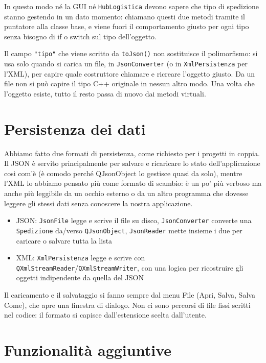 \documentclass[10pt,a4paper]{article}
\begin{document}
In questo modo né la GUI né \texttt{HubLogistica} devono sapere che tipo di spedizione stanno gestendo in un dato momento: chiamano questi due metodi tramite il puntatore alla classe base, e viene fuori il comportamento giusto per ogni tipo senza bisogno di if o switch sul tipo dell'oggetto.

Il campo \texttt{"tipo"} che viene scritto da \texttt{toJson()} non sostituisce il polimorfismo: si usa solo quando si carica un file, in \texttt{JsonConverter} (o in \texttt{XmlPersistenza} per l'XML), per capire quale costruttore chiamare e ricreare l'oggetto giusto. Da un file non si può capire il tipo C++ originale in nessun altro modo. Una volta che l'oggetto esiste, tutto il resto passa di nuovo dai metodi virtuali.

\section{Persistenza dei dati}

Abbiamo fatto due formati di persistenza, come richiesto per i progetti in coppia. Il JSON è servito principalmente per salvare e ricaricare lo stato dell'applicazione così com'è (è comodo perché QJsonObject lo gestisce quasi da solo), mentre l'XML lo abbiamo pensato più come formato di scambio: è un po' più verboso ma anche più leggibile da un occhio esterno o da un altro programma che dovesse leggere gli stessi dati senza conoscere la nostra applicazione.

\begin{itemize}
  \item JSON: \texttt{JsonFile} legge e scrive il file su disco, \texttt{JsonConverter} converte una \texttt{Spedizione} da/verso \texttt{QJsonObject}, \texttt{JsonReader} mette insieme i due per caricare o salvare tutta la lista
  \item XML: \texttt{XmlPersistenza} legge e scrive con \texttt{QXmlStreamReader}/\texttt{QXmlStreamWriter}, con una logica per ricostruire gli oggetti indipendente da quella del JSON
\end{itemize}

Il caricamento e il salvataggio si fanno sempre dal menu File (Apri, Salva, Salva Come), che apre una finestra di dialogo. Non ci sono percorsi di file fissi scritti nel codice: il formato si capisce dall'estensione scelta dall'utente.

\section{Funzionalità aggiuntive}
\end{document}
